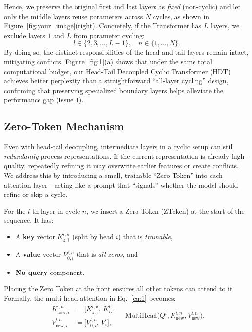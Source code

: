 Hence, we preserve the original first and last layers as \emph{fixed} (non-cyclic) and let only the middle layers reuse parameters across $N$ cycles, as shown in Figure~\ref{fig:your_image}(right).
Concretely, if the Transformer has $L$ layers, we exclude layers $1$ and $L$ from parameter cycling:
\vspace{-0.1cm}
\begin{equation}
l \in \{2,3,\dots,L-1\}, \quad n \in \{1,\dots,N\}.
\end{equation}
By doing so, the distinct responsibilities of the head and tail layers remain intact, mitigating conflicts. Figure~\ref{fig:1}(a) shows that under the same total computational budget, our Head-Tail Decoupled Cyclic Transformer (HDT) achieves better perplexity than a straightforward “all-layer cycling” design, confirming that preserving specialized boundary layers helps alleviate the performance gap (Issue 1).

\subsection{Zero-Token Mechanism}
\label{sec:ztm}

Even with head-tail decoupling, intermediate layers in a cyclic setup can still \emph{redundantly} process representations. 
If the current representation is already high-quality, repeatedly refining it may overwrite earlier features or create conflicts. 
We address this by introducing a small, trainable “Zero Token” into each attention layer—acting like a prompt that “signals” whether the model should refine or skip a cycle.

For the $l$-th layer in cycle $n$, we insert a Zero Token (ZToken) at the start of the sequence. It has:
\begin{itemize}[leftmargin=1.1em]
    \item A \textbf{key} vector $K_{z,i}^{l,n}$ (split by head $i$) that is \emph{trainable},
    \item A \textbf{value} vector $V_{0,i}^{l,n}$ that is \emph{all zeros}, and
    \item \textbf{No query} component.
\end{itemize}
Placing the Zero Token at the front ensures all other tokens can attend to it. Formally, the multi-head attention in Eq.~\ref{eq:1} becomes:
\begin{equation}
\label{eq:kv}
\begin{aligned}
K_{\text{new}, i}^{l,n} &= \bigl[K_{z,i}^{l,n},\, K_i^l\bigr], \\
V_{\text{new}, i}^{l,n} &= \bigl[V_{0,i}^{l,n},\, V_i^l\bigr], 
\end{aligned}
\quad
\text{MultiHead}\bigl(Q^l, K_{\text{new}}^{l,n}, V_{\text{new}}^{l,n}\bigr).
\end{equation}

